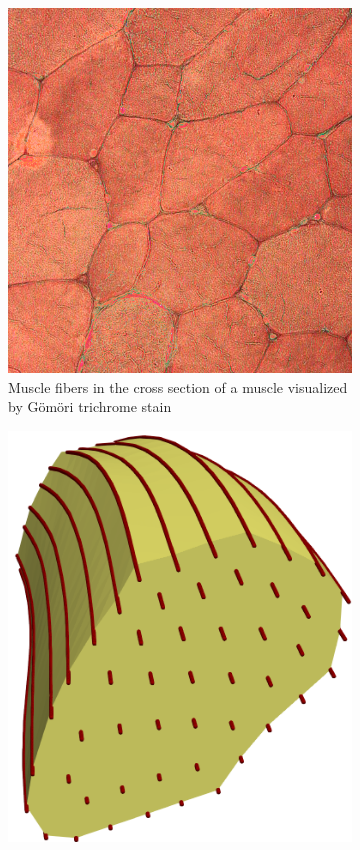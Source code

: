 \begin{figure}%
  \centering%
  \begin{subfigure}[t]{0.32\textwidth}%
    \centering%
    \includegraphics[width=\textwidth]{images/motor_unit_assignment/mus1.png}%
    \caption{Muscle fibers in the cross section of a muscle visualized by Gömöri trichrome stain\footnotemark}%
    \label{fig:mu_grid0}%
  \end{subfigure}
  \quad
  \begin{subfigure}[t]{0.28\textwidth}%
    \centering%
    \includegraphics[width=\textwidth]{images/motor_unit_assignment/muscle_mesh_fibers.png}%

\end{subfigure}
\end{figure}
